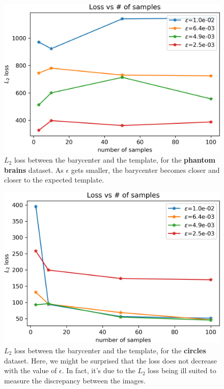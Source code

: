 \begin{figure}[p]
    \centering
    \includegraphics[width=.6\textwidth]{samples/2/l2_loss_brain.png}
    \caption{$L_2$ loss between the barycenter and the template, for the \textbf{phantom brains} dataset. As $\epsilon$ gets smaller, the barycenter becomes closer and closer to the expected template.}
    \label{fig:l2_loss_brain}
\end{figure}

\begin{figure}[p]
    \centering
    \includegraphics[width=.6\textwidth]{samples/2/l2_loss_circle.png}
    \caption{$L_2$ loss between the barycenter and the template, for the \textbf{circles} dataset. Here, we might be surprised that the loss does not decrease with the value of $\epsilon$. In fact, it's due to the $L_2$ loss being ill suited to measure the discrepancy between the images.}
    \label{fig:l2_loss_circle}
\end{figure}